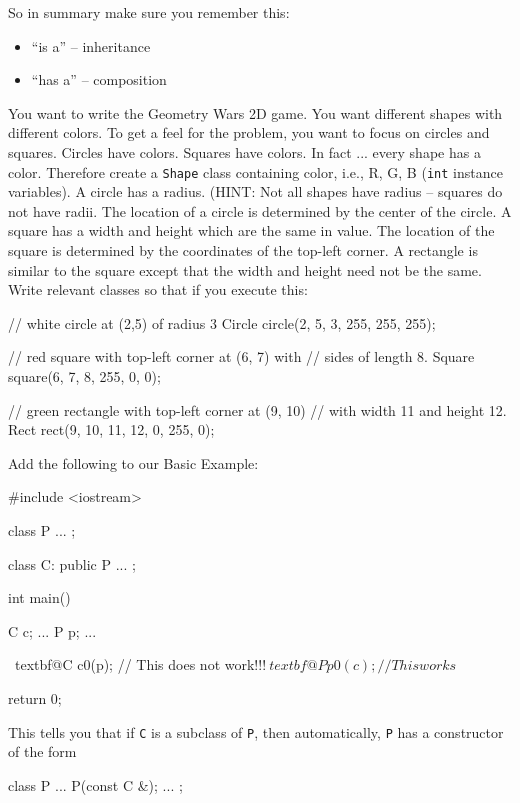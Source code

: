 So in summary make sure you remember this:
\begin{itemize}
\item
  ``is a'' -- inheritance
\item
  ``has a'' -- composition
\end{itemize}

\begin{ex}
You want to write the Geometry Wars 2D game. You want
different shapes with different colors. To get a feel for the problem,
you want to focus on circles and squares. Circles have colors. Squares
have colors. In fact ... every shape has a color. Therefore create
a \verb!Shape! class containing color, i.e., R, G, B (\verb!int! instance variables). A circle has a radius. (HINT: Not all shapes have radius -- squares do not have radii. The location of a circle is determined by the center of the circle. A square has a width and height which are the same in value. The location of the square is determined by the coordinates of the top-left corner. A rectangle is similar to the square except that the width and height need not be the same. Write relevant classes so that if you execute this:
\begin{console}
// white circle at (2,5) of radius 3
Circle circle(2, 5, 3, 255, 255, 255);

// red square with top-left corner at (6, 7) with
// sides of length 8.
Square square(6, 7, 8, 255, 0, 0);

// green rectangle with top-left corner at (9, 10)
// with width 11 and height 12.
Rect rect(9, 10, 11, 12, 0, 255, 0);
\end{console}
\end{ex}
\newpage{}

Add the following to our Basic Example:
\begin{console}[commandchars=\~\@\$]
#include <iostream>

class P
{     
      ...
};

class C: public P
{
        ...
};

int main()
{   
    C c;
    ...
    P p;
    ...
    
    ~textbf@C c0(p); // This does not work!!!$
    ~textbf@P p0(c); // This works$

    return 0;
}
\end{console}

This tells you that if \verb!C! is a subclass of \verb!P!, then automatically, \verb!P! has a constructor of the form
\begin{console}
class P
{     
      ...
      P(const C &);
      ...
};
\end{console}

